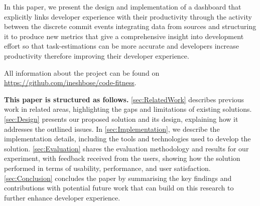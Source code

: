 \vskip8pt  In this paper, we present the design and implementation of a dashboard that explicitly links developer experience with their productivity through the activity between the discrete commit events integrating data from sources and structuring it to produce new metrics that give a comprehensive insight into development effort so that task-estimations can be more accurate and developers increase productivity therefore improving their developer experience.

\vskip4pt \noindent All information about the project can be found on\\\url{https://github.com/ineshbose/code-fitness}.

\vskip6pt \noindent
{\bf This paper is structured as follows.}
\autoref{sec:RelatedWork} describes previous work in related areas, highlighting the gaps and limitations of existing solutions.
\autoref{sec:Design} presents our proposed solution and its design, explaining how it addresses the outlined issues.
In \autoref{sec:Implementation}, we describe the implementation details, including the tools and technologies used to develop the solution.
\autoref{sec:Evaluation} shares the evaluation methodology and results for our experiment, with feedback received from the users, showing how the solution performed in terms of usability, performance, and user satisfaction.
\autoref{sec:Conclusion} concludes the paper by summarising the key findings and contributions with potential future work that can build on this research to further enhance developer experience.


